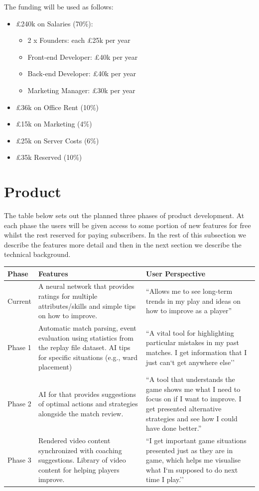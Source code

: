 \documentclass[12pt]{article} %
\let\oldsection\section
\renewcommand\section{\clearpage\oldsection}
\begin{document}
The funding will be used as follows:\\
\begin{itemize}
\item \pounds240k on Salaries (70\%):
\begin{itemize}
\item 2 x Founders: each \pounds25k per year
\item Front-end Developer: \pounds40k per year
\item Back-end Developer: \pounds40k per year
\item Marketing Manager: \pounds30k per year 
\end{itemize}
\item \pounds36k on Office Rent (10\%)
\item \pounds15k on Marketing (4\%)
\item \pounds25k on Server Costs (6\%)
\item \pounds35k Reserved (10\%)
\end{itemize}

\section{Product}

The table below sets out the planned three phases of product development. At each phase the users will be given access to some portion of new features for free whilst the rest reserved for paying subscribers. In the rest of this subsection we describe the features more detail and then in the next section we describe the technical background.

\begin{center}
\onehalfspacing
    \begin{tabular}{ | l | p{6cm} | p{6cm} |}
    \hline
    Phase & Features  & User Perspective\\ \hline
    Current & A neural network that provides ratings for multiple attributes/skills and simple tips on how to improve.
 &``Allows me to see long-term trends in my play and ideas on how to improve as a player''\\  \hline
    Phase 1 & Automatic match parsing, event evaluation using statistics from the replay file dataset. AI tips for specific situations (e.g., ward placement)
 & ``A vital tool for highlighting particular mistakes in my past matches. I get information that I just can`t get anywhere else'' \\ \hline
    Phase 2 & AI for that provides suggestions of optimal actions and strategies alongside the match review.  & ``A tool that understands the game shows me what I need to focus on if I want to improve. I get presented alternative strategies and see how I could have done better.''  \\
    \hline
     Phase 3 & Rendered video content synchronized with coaching suggestions. Library of video content for helping players improve. & ``I get important game situations presented just as they are in game, which helps me visualise what I`m supposed to do next time I play.'' \\
    \hline
    \end{tabular}
\end{center}
\pagebreak
\end{document}

